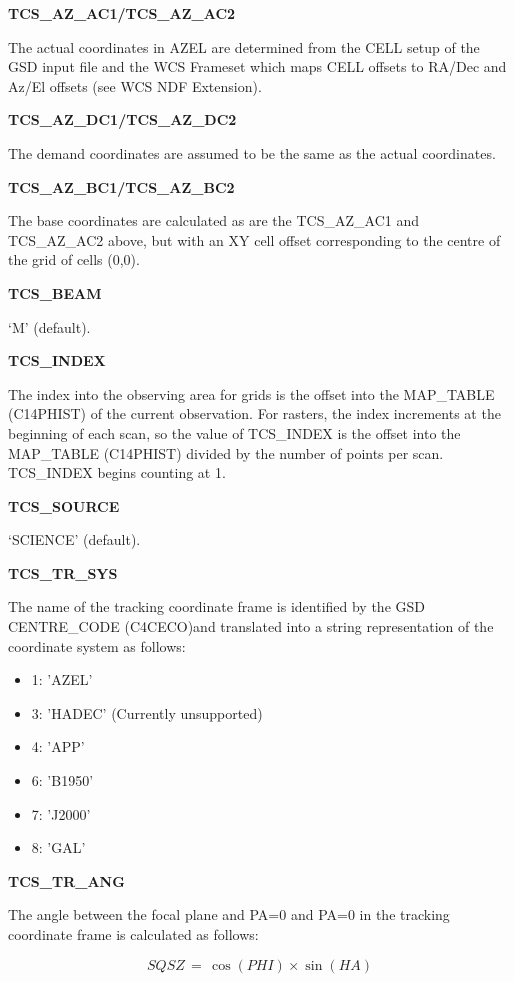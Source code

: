 \documentclass[twoside,11pt,nolof]{starlink}
\providecommand{\centreCode}{CENTRE\_CODE (C4CECO)}
\providecommand{\mapTable}{MAP\_TABLE (C14PHIST)}
\begin{document}
\textbf{TCS\_AZ\_AC1/TCS\_AZ\_AC2}

The actual coordinates in AZEL are determined from the CELL setup of the GSD input file and the WCS Frameset which maps CELL offsets to RA/Dec and Az/El offsets (see WCS NDF Extension).

\textbf{TCS\_AZ\_DC1/TCS\_AZ\_DC2}

The demand coordinates are assumed to be the same as the actual coordinates.

\textbf{TCS\_AZ\_BC1/TCS\_AZ\_BC2}

The base coordinates are calculated as are the TCS\_AZ\_AC1 and TCS\_AZ\_AC2 above, but with an XY cell offset corresponding to the centre of the grid of cells (0,0).

\textbf{TCS\_BEAM}

`M' (default).

\textbf{TCS\_INDEX}

The index into the observing area for grids is the offset into the \mapTable{} of the current observation.  For rasters, the index increments at the beginning of each scan, so the value of TCS\_INDEX is the offset into the \mapTable{} divided by the number of points per scan.  TCS\_INDEX begins counting at 1.

\textbf{TCS\_SOURCE}

`SCIENCE' (default).

\textbf{TCS\_TR\_SYS}

The name of the tracking coordinate frame is identified by the GSD \centreCode and translated into a string representation of the coordinate system as follows:

\begin{itemize}
\item 1: 'AZEL'
\item 3: 'HADEC' (Currently unsupported)
\item 4: 'APP'
\item 6: 'B1950'
\item 7: 'J2000'
\item 8: 'GAL'
\end{itemize}

\textbf{TCS\_TR\_ANG}

The angle between the focal plane and PA=0 and PA=0 in the tracking coordinate frame is calculated as follows:

\begin{equation}
SQSZ \,=\, \cos(PHI)\times\sin(HA)
\end{equation}
\end{document}
